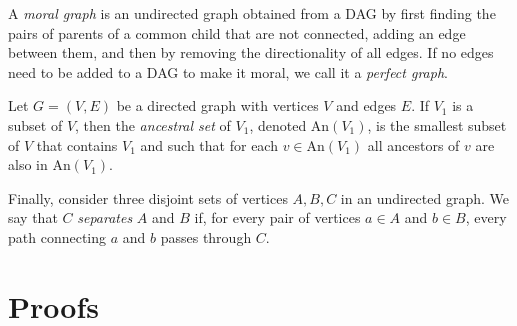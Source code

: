 \documentclass[12pt,letterpaper]{article}
\theoremstyle{propstyle}
\theoremstyle{propstyle}
\theoremstyle{propstyle}
\theoremstyle{propstyle}
\theoremstyle{propstyle}
\newcommand{\An}{\text{An}}
\begin{document}
A \emph{moral graph} is an undirected graph obtained from a DAG by first finding the pairs of parents of a common child that are not connected, adding an edge between them, and then by removing the directionality of all edges. If no edges need to be added to a DAG to make it moral, we call it a \emph{perfect graph}.

Let $G=(V,E)$ be a directed graph with vertices $V$ and edges $E$. If $V_1$ is a subset of $V$, then the \emph{ancestral set} of $V_1$, denoted $\An(V_1)$, is the smallest subset of $V$ that contains $V_1$ and such that for each $v \in \An(V_1)$ all ancestors of $v$ are also in $\An(V_1)$. 

Finally, consider three disjoint sets of vertices $A, B, C$ in an undirected graph. We say that $C$ \emph{separates} $A$ and $B$ if, for every pair of vertices $a \in A$ and $b \in B$, every path connecting $a$ and $b$ passes through $C$.


\section{Proofs \label{app:proofs}}
\end{document}
